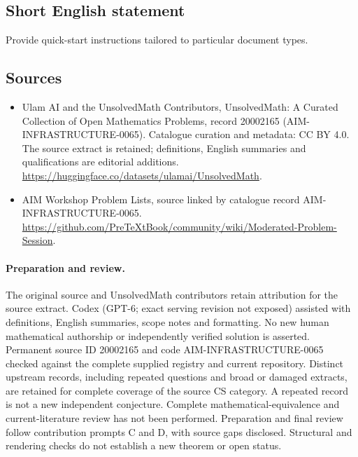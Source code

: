 \documentclass[11pt]{article}
\begin{document}
\subsection{Short English statement}
Provide quick-start instructions tailored to particular document types.
\subsection{Sources}
\begin{itemize}
\item[\hypertarget{source:20002165:1}{S1}] Ulam AI and the UnsolvedMath Contributors, UnsolvedMath: A Curated Collection of Open Mathematics Problems, record 20002165 (AIM-INFRASTRUCTURE-0065). Catalogue curation and metadata: CC BY 4.0. The source extract is retained; definitions, English summaries and qualifications are editorial additions.
\url{https://huggingface.co/datasets/ulamai/UnsolvedMath}.
\item[\hypertarget{source:20002165:2}{S2}] AIM Workshop Problem Lists, source linked by catalogue record AIM-INFRASTRUCTURE-0065.
\url{https://github.com/PreTeXtBook/community/wiki/Moderated-Problem-Session}.
\end{itemize}
\paragraph{Preparation and review.}
The original source and UnsolvedMath contributors retain attribution for the source extract. Codex (GPT-6; exact serving revision not exposed) assisted with definitions, English summaries, scope notes and formatting. No new human mathematical authorship or independently verified solution is asserted. Permanent source ID 20002165 and code AIM-INFRASTRUCTURE-0065 checked against the complete supplied registry and current repository. Distinct upstream records, including repeated questions and broad or damaged extracts, are retained for complete coverage of the source CS category. A repeated record is not a new independent conjecture. Complete mathematical-equivalence and current-literature review has not been performed. Preparation and final review follow contribution prompts C and D, with source gaps disclosed. Structural and rendering checks do not establish a new theorem or open status.
\label{end:20002165}
\end{document}
